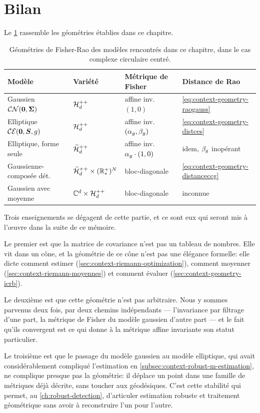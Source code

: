 \section{Bilan}
\label{sec:context-geometry-bilan}

Le \cref{tab:context-geometry-summary} rassemble les géométries établies dans ce chapitre.

\begin{table}[h]
  \centering
  \caption{Géométries de Fisher-Rao des modèles rencontrés dans ce chapitre, dans le cas complexe circulaire centré.}
  \label{tab:context-geometry-summary}
  \footnotesize
  \begin{tabular}{@{}llll@{}}
    \toprule
    Modèle & Variété & Métrique de Fisher & Distance de Rao \\
    \midrule
    Gaussien $\mathcal{CN}(\boldsymbol{0},\boldsymbol{\Sigma})$
      & $\mathcal{H}_{d}^{++}$
      & affine inv. $(1,0)$
      & \cref{eq:context-geometry-raogauss} \\
    Elliptique $\mathcal{CE}(\boldsymbol{0},\boldsymbol{S},g)$
      & $\mathcal{H}_{d}^{++}$
      & affine inv. $(\alpha_g,\beta_g)$
      & \cref{eq:context-geometry-distces} \\
    Elliptique, forme seule
      & $\widetilde{\mathcal{H}}_{d}^{++}$
      & affine inv. $\alpha_g\cdot(1,0)$
      & idem, $\beta_g$ inopérant \\
    Gaussienne-composée dét.
      & $\widetilde{\mathcal{H}}_{d}^{++}\times(\mathbb{R}_*^+)^{N}$
      & bloc-diagonale
      & \cref{eq:context-geometry-distanceccg} \\
    Gaussien avec moyenne
      & $\mathbb{C}^d\times\mathcal{H}_{d}^{++}$
      & bloc-diagonale
      & inconnue \\
    \bottomrule
  \end{tabular}
\end{table}

Trois enseignements se dégagent de cette partie, et ce sont eux qui seront mis à l'\oe uvre dans la suite de ce mémoire.

Le premier est que la matrice de covariance n'est pas un tableau de nombres. Elle vit dans un cône, et la géométrie de ce cône n'est pas une élégance formelle: elle dicte comment estimer (\cref{sec:context-riemann-optimization}), comment moyenner (\cref{sec:context-riemann-moyennes}) et comment évaluer (\cref{sec:context-geometry-icrb}).

Le deuxième est que cette géométrie n'est pas arbitraire. Nous y sommes parvenus deux fois, par deux chemins indépendants --- l'invariance par filtrage d'une part, la métrique de Fisher du modèle gaussien d'autre part --- et le fait qu'ils convergent est ce qui donne à la métrique affine invariante son statut particulier.

Le troisième est que le passage du modèle gaussien au modèle elliptique, qui avait considérablement compliqué l'estimation en \cref{subsec:context-robust-m-estimation}, ne complique presque pas la géométrie: il déplace un point dans une famille de métriques déjà décrite, sans toucher aux géodésiques. C'est cette stabilité qui permet, au \cref{ch:robust-detection}, d'articuler estimation robuste et traitement géométrique sans avoir à reconstruire l'un pour l'autre.

